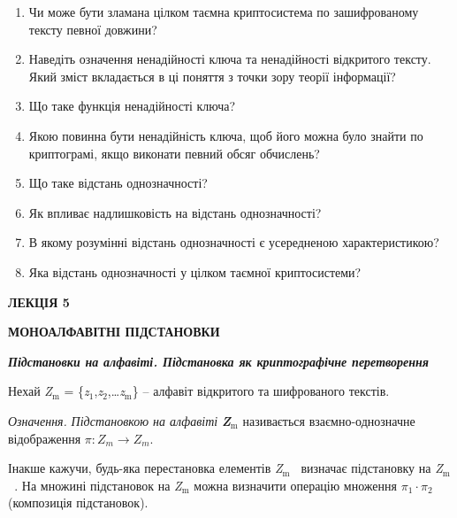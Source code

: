 \documentclass[a4paper]{article}
\newcommand\textsubscript[1]{\ensuremath{{}_{\text{#1}}}}
\newcommand\liststyleWWviiiNumx{%
\renewcommand\theenumi{\arabic{enumi}}
\renewcommand\theenumii{\alph{enumii}}
\renewcommand\theenumiii{\roman{enumiii}}
\renewcommand\theenumiv{\arabic{enumiv}}
\renewcommand\labelenumi{\theenumi.}
\renewcommand\labelenumii{\theenumii.}
\renewcommand\labelenumiii{\theenumiii.}
\renewcommand\labelenumiv{\theenumiv.}
}
\newcounter{}
\begin{document}
\liststyleWWviiiNumx
\begin{enumerate}
\item Чи може бути зламана цілком таємна криптосистема по зашифрованому тексту
певної довжини?
\item Наведіть означення ненадійності ключа та ненадійності відкритого тексту.
Який зміст вкладається в ці поняття з точки зору теорії інформації?
\item Що таке функція ненадійності ключа?
\item Якою повинна бути ненадійність ключа, щоб його можна було знайти по
криптограмі, якщо виконати певний обсяг обчислень?
\item Що таке відстань однозначності?
\item Як впливає надлишковість на відстань однозначності?
\item В якому розумінні відстань однозначності є усередненою характеристикою?
\item Яка відстань однозначності у цілком таємної криптосистеми? 
\end{enumerate}

\bigskip


\bigskip


\bigskip

{\bfseries
ЛЕКЦІЯ  5}


\bigskip

{\centering\bfseries
МОНОАЛФАВІТНІ  ПІДСТАНОВКИ
\par}


\bigskip


\bigskip

{\centering\bfseries\itshape
Підстановки на алфавіті. Підстановка як криптографічне перетворення
\par}


\bigskip


\bigskip

Нехай \textit{Z}\textit{\textsubscript{m}} =
\{\textit{z}\textsubscript{1},\textit{z}\textsubscript{2},…\textit{z}\textit{\textsubscript{m}}\}
– алфавіт відкритого та шифрованого текстів.

\textit{Означення.}\textit{ Підстановкою на алфавіті}\textbf{\textit{
}}\textbf{\textit{Z}}\textbf{\textit{\textsubscript{m}}} називається
взаємно-однозначне відображення  ${\pi :Z_{{m}}\rightarrow Z_{{m}}}$.

Інакше кажучи, будь-яка перестановка елементів
\textit{Z}\textit{\textsubscript{m}}\textsubscript{ } визначає підстановку на
\textit{Z}\textit{\textsubscript{m}}\textsubscript{ }. На множині підстановок
на \textit{Z}\textit{\textsubscript{m}} можна визначити операцію множення 
${\pi _{{1}}\cdot \pi _{{2}}}$ (композиція підстановок).
\end{document}
